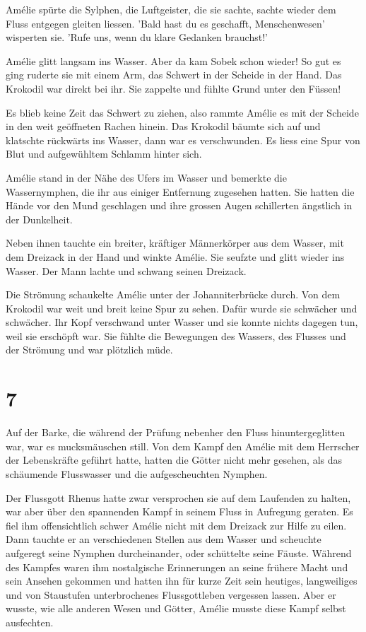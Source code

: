 \documentclass[11pt,titlepage,a5paper]{book}
\begin{document}
Amélie spürte die Sylphen, die Luftgeister, die sie sachte, sachte wieder dem Fluss entgegen gleiten liessen. 'Bald hast du es geschafft, Menschenwesen' wisperten sie. 'Rufe uns, wenn du klare Gedanken brauchst!'

Amélie glitt langsam ins Wasser. Aber da kam Sobek schon wieder! So gut es ging ruderte sie mit einem Arm, das Schwert in der Scheide in der Hand. Das Krokodil war direkt bei ihr. Sie zappelte und fühlte Grund unter den Füssen! 

Es blieb keine Zeit das Schwert zu ziehen, also rammte Amélie es mit der Scheide in den weit geöffneten Rachen hinein. Das Krokodil bäumte sich auf und klatschte rückwärts ins Wasser, dann war es verschwunden. Es liess eine Spur von Blut und aufgewühltem Schlamm hinter sich. 

 Amélie stand in der Nähe des Ufers im Wasser und bemerkte die Wassernymphen, die ihr aus einiger Entfernung zugesehen hatten. Sie hatten die Hände vor den Mund geschlagen und ihre grossen Augen schillerten ängstlich in der Dunkelheit. 
 
Neben ihnen tauchte ein breiter, kräftiger Männerkörper aus dem Wasser, mit dem Dreizack in der Hand und winkte Amélie. Sie seufzte und glitt wieder ins Wasser. Der Mann lachte und schwang seinen Dreizack. 

Die Strömung schaukelte Amélie unter der Johanniterbrücke durch. Von dem Krokodil war weit und breit keine Spur zu sehen. Dafür wurde sie schwächer und schwächer. Ihr Kopf verschwand unter Wasser und sie konnte nichts dagegen tun, weil sie erschöpft war. Sie fühlte die Bewegungen des Wassers, des Flusses und der Strömung und war plötzlich müde.

\section*{7}

Auf der Barke, die während der Prüfung nebenher den Fluss hinuntergeglitten war, war es mucksmäuschen still. Von dem Kampf den Amélie mit dem Herrscher der Lebenskräfte geführt hatte, hatten die Götter nicht mehr gesehen, als das schäumende Flusswasser und die aufgescheuchten Nymphen.

Der Flussgott Rhenus hatte zwar versprochen sie auf dem Laufenden zu halten, war aber über den spannenden Kampf in seinem Fluss in Aufregung geraten. Es fiel ihm offensichtlich schwer Amélie nicht mit dem Dreizack zur Hilfe zu eilen. Dann tauchte er an verschiedenen Stellen aus dem Wasser und scheuchte aufgeregt seine Nymphen durcheinander, oder schüttelte seine Fäuste. Während des Kampfes waren ihm nostalgische Erinnerungen an seine frühere Macht und sein Ansehen gekommen und hatten ihn für kurze Zeit sein heutiges, langweiliges und von Staustufen unterbrochenes Flussgottleben vergessen lassen.  Aber er wusste, wie alle anderen Wesen und Götter, Amélie musste diese Kampf selbst ausfechten. 
\end{document}
